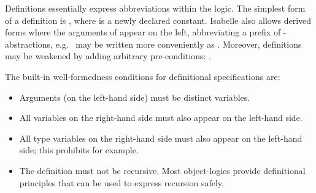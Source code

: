 \begin{isabellebody}
\begin{isamarkuptext}
  Definitions essentially express abbreviations within the logic.  The
  simplest form of a definition is , where  is a newly declared constant.  Isabelle also allows derived forms
  where the arguments of  appear on the left, abbreviating a
  prefix of -abstractions, e.g.\  may be
  written more conveniently as .  Moreover,
  definitions may be weakened by adding arbitrary pre-conditions:
  .

  \medskip The built-in well-formedness conditions for definitional
  specifications are:

  \begin{itemize}

  \item Arguments (on the left-hand side) must be distinct variables.

  \item All variables on the right-hand side must also appear on the
  left-hand side.

  \item All type variables on the right-hand side must also appear on
  the left-hand side; this prohibits  for example.

  \item The definition must not be recursive.  Most object-logics
  provide definitional principles that can be used to express
  recursion safely.


\end{itemize}
\end{isamarkuptext}
\end{isabellebody}
